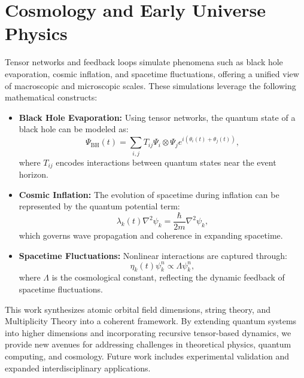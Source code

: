 \documentclass[12]{amsart}
\theoremstyle{plain}
\begin{document}
\section{Cosmology and Early Universe Physics}
Tensor networks and feedback loops simulate phenomena such as black hole evaporation, cosmic inflation, and spacetime fluctuations, offering a unified view of macroscopic and microscopic scales. These simulations leverage the following mathematical constructs:
\begin{itemize}
    \item \textbf{Black Hole Evaporation:} Using tensor networks, the quantum state of a black hole can be modeled as:
    \begin{equation}
    \Psi_{\text{BH}}(t) = \sum_{i,j} T_{ij} \Psi_i \otimes \Psi_j e^{i(\theta_i(t) + \theta_j(t))},
    \end{equation}
    where \( T_{ij} \) encodes interactions between quantum states near the event horizon.
    \item \textbf{Cosmic Inflation:} The evolution of spacetime during inflation can be represented by the quantum potential term:
    \begin{equation}
    \lambda_k(t) \nabla^2 \psi_k = \frac{\hbar}{2m} \nabla^2 \psi_k,
    \end{equation}
    which governs wave propagation and coherence in expanding spacetime.
    \item \textbf{Spacetime Fluctuations:} Nonlinear interactions are captured through:
    \begin{equation}
    \eta_k(t) \psi_k^n \propto \Lambda \psi_k^n,
    \end{equation}
    where \( \Lambda \) is the cosmological constant, reflecting the dynamic feedback of spacetime fluctuations.
\end{itemize}

This work synthesizes atomic orbital field dimensions, string theory, and Multiplicity Theory into a coherent framework. By extending quantum systems into higher dimensions and incorporating recursive tensor-based dynamics, we provide new avenues for addressing challenges in theoretical physics, quantum computing, and cosmology. Future work includes experimental validation and expanded interdisciplinary applications.
\end{document}
